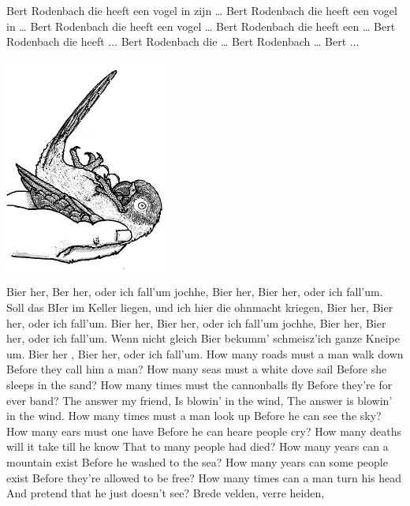 \documentclass{article}
\begin{document}
\begin{songs}{}
\endverse
\beginverse
Bert Rodenbach die heeft een vogel in zijn …
\endverse
\beginverse
Bert Rodenbach die heeft een vogel in …
\endverse
\beginverse
Bert Rodenbach die heeft een vogel …
\endverse
\beginverse
Bert Rodenbach die heeft een …
\endverse
\beginverse
Bert Rodenbach die heeft ...
\endverse
\beginverse
Bert Rodenbach die …
\endverse
\beginverse
Bert Rodenbach …
\endverse
\beginverse
Bert ...
\endverse
\endsong
\begin{intersong}
    \includegraphics[width=0.4\textwidth]{bertrodenbach}
\end{intersong}
\beginverse*
Bier her, Ber her, 
oder ich fall’um jochhe,
Bier her, Bier her,
oder ich fall’um.
Soll das BIer im Keller liegen,
und ich hier die ohnmacht kriegen,
Bier her, Bier her,
oder ich fall’um.
\endverse
\beginverse*
Bier her, Bier her,
oder ich fall’um jochhe,
Bier her, Bier her,
oder ich fall’um.
Wenn nicht gleich Bier bekumm’
schmeisz’ich ganze Kneipe um.
Bier her , Bier her,
oder ich fall’um.
\endverse
\endsong
{}
\beginverse
How many roads must a man walk down
Before they call him a man?
How many seas must a white dove sail
Before she sleeps in the sand?
How many times must the cannonballs fly
Before they're for ever band?
\endverse
\beginchorus
The answer my friend,
Is blowin' in the wind,
The answer is blowin' in the wind.
\endchorus
\beginverse
How many times must a man look up
Before he can see the sky?
How many ears must one have
Before he can heare people cry?
How many deaths will it take till he know
That to many people had died?
\endverse
\beginverse
How many years can a mountain exist
Before he washed to the sea?
How many years can some people exist
Before they're allowed to be free?
How many times can a man turn his head
And pretend that he just doesn't see?
\endverse
\endsong
{}
\beginverse*
Brede velden, verre heiden,

\end{songs}
\end{document}
